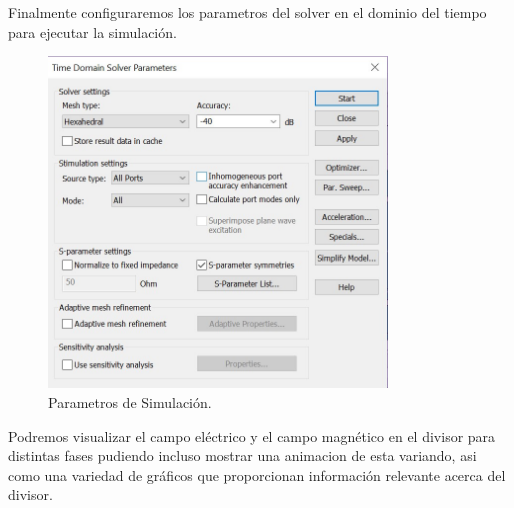 \documentclass[a4paper]{IEEEtran} %
\begin{document}
Finalmente configuraremos los parametros del solver en el dominio del tiempo para ejecutar la simulación.
\begin{figure}[h]    
    \centering
    \includegraphics[width=9cm]{imagenes/img12}
    \caption{Parametros de Simulación.}
    \label{fig:modelamiento7}
\end{figure}

Podremos visualizar el campo eléctrico y el campo magnético en el divisor para distintas fases pudiendo incluso mostrar una animacion de esta variando, asi como una variedad de gráficos que proporcionan información relevante acerca del divisor.
\end{document}
